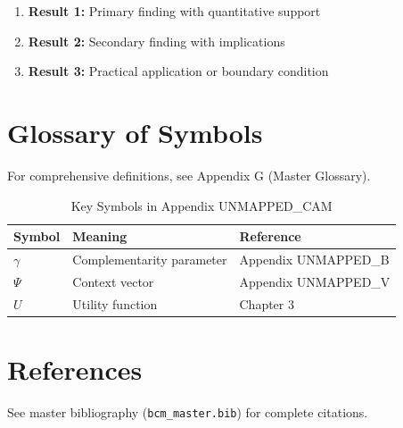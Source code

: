 \begin{enumerate}
    \item \textbf{Result 1:} Primary finding with quantitative support
    \item \textbf{Result 2:} Secondary finding with implications
    \item \textbf{Result 3:} Practical application or boundary condition
\end{enumerate}

\section{Glossary of Symbols}
\label{sec:cam-glossary}

For comprehensive definitions, see Appendix G (Master Glossary).

\begin{table}[htbp]
\centering
\caption{Key Symbols in Appendix UNMAPPED_CAM}
\begin{tabular}{lll}
\toprule
\textbf{Symbol} & \textbf{Meaning} & \textbf{Reference} \\
\midrule
$\gamma$ & Complementarity parameter & Appendix UNMAPPED_B \\
$\Psi$ & Context vector & Appendix UNMAPPED_V \\
$U$ & Utility function & Chapter 3 \\
\bottomrule
\end{tabular}
\end{table}


\section{References}
\label{sec:cam-references}

See master bibliography (\texttt{bcm\_master.bib}) for complete citations.

\nocite{bcm_master}

